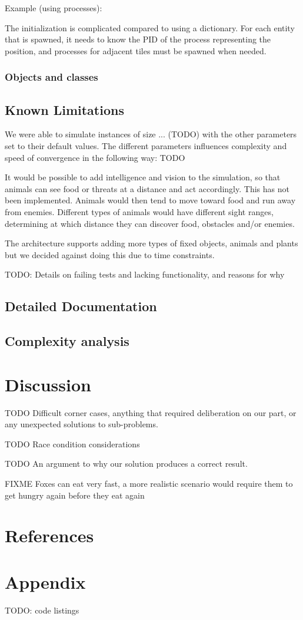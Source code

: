 \documentclass[12pt]{article}
\begin{document}
Example (using processes):

The initialization is complicated compared to using a dictionary. For each entity that is spawned, it needs to know the PID of the process representing the position, and processes for adjacent tiles must be spawned when needed.

\subsubsection{Objects and classes}

\subsection{Known Limitations}

We were able to simulate instances of size ... (TODO) with the other parameters set to their default values. The different parameters influences complexity and speed of convergence in the following way: TODO

It would be possible to add intelligence and vision to the simulation, so that animals can see food or threats at a distance and act accordingly. This has not been implemented. Animals would then tend to move toward food and run away from enemies. Different types of animals would have different sight ranges, determining at which distance they can discover food, obstacles and/or enemies.

The architecture supports adding more types of fixed objects, animals and plants but we decided against doing this due to time constraints.

TODO: Details on failing tests and lacking functionality, and reasons for why

\subsection{Detailed Documentation} %

\subsection{Complexity analysis}

\section{Discussion}

TODO Difficult corner cases, anything that required deliberation on our part, or any unexpected solutions to sub-problems.

TODO Race condition considerations

TODO An argument to why our solution produces a correct result.

FIXME Foxes can eat very fast, a more realistic scenario would require them to get hungry again before they eat again

\section{References}

\section{Appendix}

TODO: code listings
\end{document}
